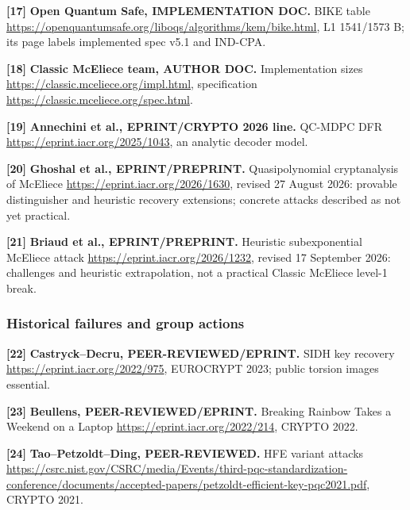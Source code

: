 \documentclass[
  10pt,
  a4paper,
]{article}
\begin{document}
\hypertarget{ref17}{}

\textbf{{[}17{]}} \textbf{Open Quantum Safe, IMPLEMENTATION DOC.} BIKE
table \url{https://openquantumsafe.org/liboqs/algorithms/kem/bike.html},
L1 1541/1573 B; its page labels implemented spec v5.1 and IND-CPA.

\hypertarget{ref18}{}

\textbf{{[}18{]}} \textbf{Classic McEliece team, AUTHOR DOC.}
Implementation sizes \url{https://classic.mceliece.org/impl.html},
specification \url{https://classic.mceliece.org/spec.html}.

\hypertarget{ref19}{}

\textbf{{[}19{]}} \textbf{Annechini et al., EPRINT/CRYPTO 2026 line.}
QC-MDPC DFR \url{https://eprint.iacr.org/2025/1043}, an analytic decoder
model.

\hypertarget{ref20}{}

\textbf{{[}20{]}} \textbf{Ghoshal et al., EPRINT/PREPRINT.}
Quasipolynomial cryptanalysis of McEliece
\url{https://eprint.iacr.org/2026/1630}, revised 27 August 2026:
provable distinguisher and heuristic recovery extensions; concrete
attacks described as not yet practical.

\hypertarget{ref21}{}

\textbf{{[}21{]}} \textbf{Briaud et al., EPRINT/PREPRINT.} Heuristic
subexponential McEliece attack \url{https://eprint.iacr.org/2026/1232},
revised 17 September 2026: challenges and heuristic extrapolation, not a
practical Classic McEliece level-1 break.

\hypertarget{historical-failures-and-group-actions}{%
\subsubsection{Historical failures and group
actions}\label{historical-failures-and-group-actions}}

\hypertarget{ref22}{}

\textbf{{[}22{]}} \textbf{Castryck--Decru, PEER-REVIEWED/EPRINT.} SIDH
key recovery \url{https://eprint.iacr.org/2022/975}, EUROCRYPT 2023;
public torsion images essential.

\hypertarget{ref23}{}

\textbf{{[}23{]}} \textbf{Beullens, PEER-REVIEWED/EPRINT.} Breaking
Rainbow Takes a Weekend on a Laptop
\url{https://eprint.iacr.org/2022/214}, CRYPTO 2022.

\hypertarget{ref24}{}

\textbf{{[}24{]}} \textbf{Tao--Petzoldt--Ding, PEER-REVIEWED.} HFE
variant attacks
\url{https://csrc.nist.gov/CSRC/media/Events/third-pqc-standardization-conference/documents/accepted-papers/petzoldt-efficient-key-pqc2021.pdf},
CRYPTO 2021.
\end{document}

